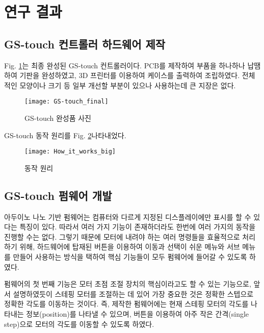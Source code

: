 \section{연구 결과}

\subsection{GS-touch 컨트롤러 하드웨어 제작}

Fig. \ref{fig:final_product}는 최종 완성된 GS-touch 컨트롤러이다. PCB를 제작하여 부품을 하나하나 납땜하여 기판을 완성하였고, 3D 프린터를 이용하여 케이스를 출력하여 조립하였다. 전체적인 모양이나 크기 등 일부 개선할 부분이 있으나 사용하는데 큰 지장은 없다.

\begin{figure}[h]
	\begin{center}
		\texttt{[image: GS-touch\_final]}
		\caption{GS-touch 완성품 사진}
		\label{fig:final_product}
	\end{center}
\end{figure}


GS-touch 동작 원리를 Fig. \ref{fig:How_it_works_big}\에 나타내었다. 

\begin{figure}[h]
	\begin{center}
		\texttt{[image: How\_it\_works\_big]}
		\caption{동작 원리}
		\label{fig:How_it_works_big}
	\end{center}
\end{figure}

\subsection{GS-touch 펌웨어 개발}

아두이노 나노 기반 펌웨어는 컴퓨터와 다르게 지정된 디스플레이에만 표시를 할 수 있다는 특징이 있다. 따라서 여러 가지 기능이 존재하더라도 한번에 여러 가지의 동작을 진행할 수는 없다. 그렇기 때문에 모터에 내려야 하는 여러 명령들을 효율적으로 처리하기 위해, 하드웨어에 탑재된 버튼을 이용하여 이동과 선택이 쉬운 메뉴와 서브 메뉴를 만들어 사용하는 방식을 택하여 핵심 기능들이 모두 펌웨어에 들어갈 수 있도록 하였다.

펌웨어의 첫 번째 기능은 모터 초점 조절 장치의 핵심이라고도 할 수 있는 기능으로, 앞서 설명하였듯이 스테핑 모터를 조절하는 데 있어 가장 중요한 것은 정확한 스텝으로 정확한 각도를 이동하는 것이다. 즉, 제작한 펌웨어에는 현재 스테핑 모터의 각도를 나타내는 정보(position)를 나타낼 수 있으며, 버튼을 이용하여 아주 작은 간격(single step)으로 모터의 각도를 이동할 수 있도록 하였다.


